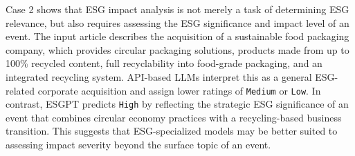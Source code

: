 \documentclass[11pt]{article}
\begin{document}
Case 2 shows that ESG impact analysis is not merely a task of determining ESG relevance, but also requires assessing the ESG significance and impact level of an event. The input article describes the acquisition of a sustainable food packaging company, which provides circular packaging solutions, products made from up to 100\% recycled content, full recyclability into food-grade packaging, and an integrated recycling system. API-based LLMs interpret this as a general ESG-related corporate acquisition and assign lower ratings of \texttt{Medium} or \texttt{Low}. In contrast, \textsf{ESGPT} predicts \texttt{High} by reflecting the strategic ESG significance of an event that combines circular economy practices with a recycling-based business transition. This suggests that ESG-specialized models may be better suited to assessing impact severity beyond the surface topic of an event.
\end{document}
